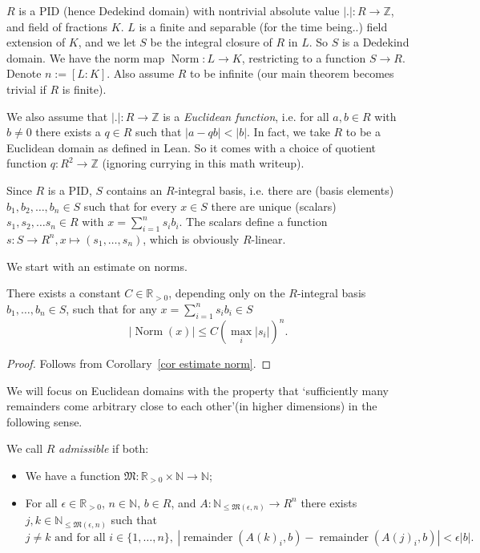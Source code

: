 \documentclass{amsart}
\newcommand{\N}{\mathbb{N}}
\newcommand{\Z}{\mathbb{Z}}
\newcommand{\R}{\mathbb{R}}
\newcommand{\M}{\mathfrak{M}}
\newcommand{\NN}{\operatorname{Norm}}
\newcommand{\remainder}{\operatorname{remainder}}
\begin{document}
$R$ is a PID (hence Dedekind domain) with nontrivial absolute value $|.| : R \to \Z$, and field of fractions $K$.
$L$ is a finite and separable (for the time being..) field extension of $K$, and we let $S$ be the integral closure of $R$ in $L$. So $S$ is a Dedekind domain.
We have the norm map $\NN: L \to K$, restricting to a function $S \to R$. Denote $n:=[L:K]$. Also assume $R$ to be infinite (our main theorem becomes trivial if $R$ is finite).

We also assume that $|.|: R \to \Z$ is a \emph{Euclidean function}, i.e. for all $a,b \in R$ with $b\not=0$ there exists a $q \in R$ such that $|a-qb|<|b|$.
In fact, we take $R$ to be a Euclidean domain as defined in Lean. So it comes with a choice of quotient function $q: R^2 \to \Z$ (ignoring currying in this math writeup).

Since $R$ is a PID, $S$ contains an $R$-integral basis, i.e. there are (basis elements) $b_1,b_2,\ldots,b_n \in S$ such that for every $x \in S$ there are unique (scalars) $s_1,s_2,\ldots s_n \in R$ with $x=\sum_{i=1}^n s_i b_i$.
The scalars define a function $s: S \to R^n, x \mapsto (s_1,\ldots,s_n)$, which is obviously $R$-linear.

We start with an estimate on norms.

\begin{lemma}\label{lem norm estimate}
There exists a constant $C \in \R_{> 0}$, depending only on the $R$-integral basis $b_1,\ldots,b_n \in S$, such that for any $x=\sum_{i=1}^n s_i b_i \in S$
\[|\NN(x)| \leq C (\max_i |s_i|)^n.\] 
\end{lemma}

\begin{proof}
Follows from Corollary~\ref{cor estimate norm}.
\end{proof}

We will focus on Euclidean domains with the property that \lq sufficiently many remainders come arbitrary close to each other\rq (in higher dimensions) in the following sense.

\begin{definition}\label{def admissible}
We call $R$ \emph{admissible} if both:
\begin{itemize}
\item We have a function $\M : \R_{>0} \times \N \to \N$;
\item For all $ \epsilon \in \R_{>0}$, $n \in \N$, $b \in R$, and $A : \N_{\leq \M(\epsilon,n)} \to R^n$ there exists $j,k \in \N_{\leq \M(\epsilon,n)}$ such that
\[j \neq k \text{ and for all } i\in\{1,\ldots,n\},\ |\remainder(A(k)_i,b)-\remainder(A(j)_i,b)| < \epsilon |b|.\]
\end{itemize}
\end{definition}
\end{document}
